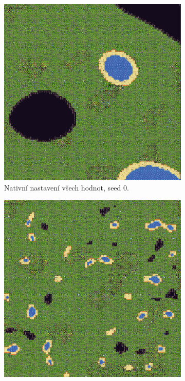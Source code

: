 \begin{figure}[H]
	\centering
	\begin{subfigure}{0.475\textwidth}
		\centering
		\includegraphics[scale=0.45]{obrazky-figures/NoiseScale70.png}
		\caption{Nativní nastavení všech hodnot, seed 0.}
		\label{NoiseNative}
	\end{subfigure}
	\begin{subfigure}{0.475\textwidth}
		\centering
		\includegraphics[scale=0.45]{obrazky-figures/NoiseScale10.png}

\end{subfigure}
\end{figure}
